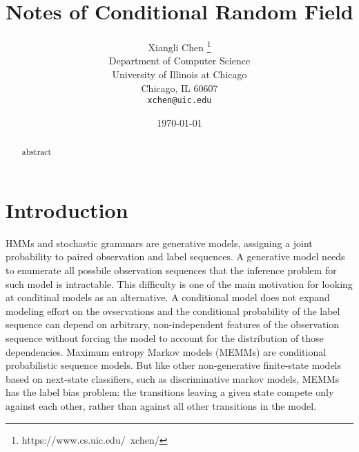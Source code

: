 \documentclass{article}
\title{Notes of Conditional Random Field}
\author{
  Xiangli Chen
  \thanks{https://www.cs.uic.edu/~xchen/}\\
  Department of Computer Science\\
  University of Illinois at Chicago\\
  Chicago, IL 60607 \\
  \texttt{xchen@uic.edu} \\
}
\begin{document}

\maketitle

\date{\today}

\begin{abstract}
abstract

\end{abstract}

\section{Introduction}\label{sec:intro}
\noindent HMMs and stochastic grammars \cite{lafferty2001conditional} are generative models, 
assigning a joint probability to paired observation and label sequences. 
A generative model needs to enumerate all possbile observation sequences 
that the inference problem for such model is intractable. 
This difficulty is one of the main motivation for looking at conditinal models as an alternative.
A conditional model does not expand modeling effort on the ovservations 
and the conditional probability of the label sequence can depend on arbitrary, 
non-independent features of the observation sequence without forcing the model 
to account for the distribution of those dependencies. 
Maximum entropy Markov models (MEMMs) are conditional probabilistic sequence models. 
But like other non-generative finite-state models based on next-state classifiers, 
such as discriminative markov models, MEMMs has the label bias problem: 
the transitions leaving a given state compete only against each other, 
rather than against all other transitions in the model.
{\small

 
}
\end{document}
